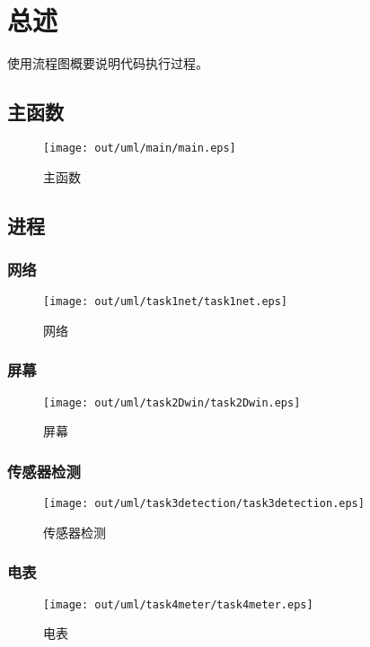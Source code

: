 \section{总述}

使用流程图概要说明代码执行过程。     

\subsection{主函数}
\begin{figure}[H]
  \centering
  \texttt{[image: out/uml/main/main.eps]}
  \caption{主函数}
  \label{fig:main}
\end{figure}

\subsection{进程}
\subsubsection{网络}
\begin{figure}[H]
  \centering
  \texttt{[image: out/uml/task1net/task1net.eps]}
  \caption{网络}
  \label{fig:task1net}
\end{figure}

\subsubsection{屏幕}
\begin{figure}[H]
  \centering
  \texttt{[image: out/uml/task2Dwin/task2Dwin.eps]}
  \caption{屏幕}
\end{figure}

\subsubsection{传感器检测}
\begin{figure}[H]
  \centering
  \texttt{[image: out/uml/task3detection/task3detection.eps]}
  \caption{传感器检测}
\end{figure}

\subsubsection{电表}
\begin{figure}[H]
  \centering
  \texttt{[image: out/uml/task4meter/task4meter.eps]}
  \caption{电表}
\end{figure}


